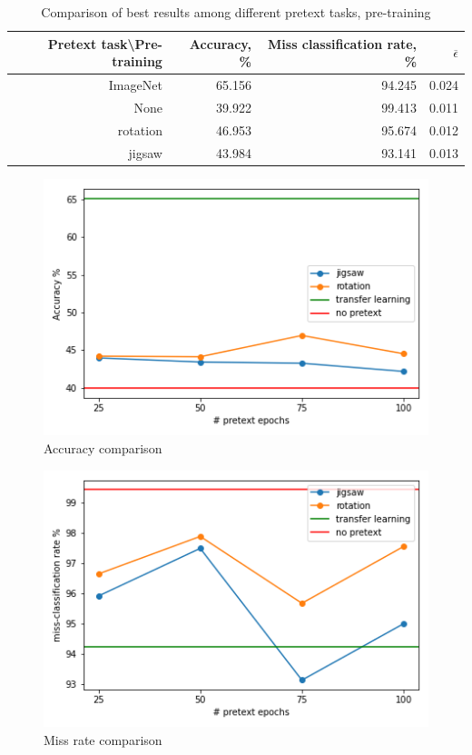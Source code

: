 \begin{table}[h]
    \begin{tabular}{|r|r|r|r|}
        \hline
        Pretext task\textbackslash Pre-training & Accuracy, \% & Miss classification rate, \% & $\overline{\epsilon}$ \\
        \hline
        ImageNet                                & 65.156       & 94.245                       & 0.024                 \\
        None                                    & 39.922       & 99.413                       & 0.011                 \\
        rotation                                & 46.953       & 95.674                       & 0.012                 \\
        jigsaw                                  & 43.984       & 93.141                       & 0.013                 \\
        \hline
    \end{tabular}
    \caption{\label{tab:table-3}Comparison of best results among different pretext tasks, pre-training}
\end{table}

\begin{figure}
    \includegraphics{images/acc}
    \caption{\label{fig:figure-1}Accuracy comparison}
\end{figure}

\begin{figure}
    \includegraphics{images/miss_rate}
    \caption{\label{fig:figure-2}Miss rate comparison}
\end{figure}

